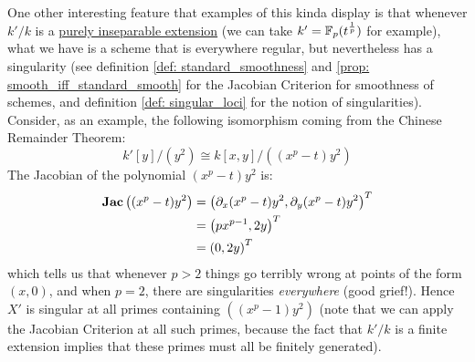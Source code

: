 \begin{example}
\begin{enumerate}
                        One other interesting feature that examples of this kinda display is that whenever $k'/k$ is a \href{https://stacks.math.columbia.edu/tag/09HD}{\underline{purely inseparable extension}} (we can take $k' = \mathbb{F}_p(t^{\frac1p})$ for example), what we have is a scheme that is everywhere regular, but nevertheless has a singularity (see definition \ref{def: standard_smoothness} and \ref{prop: smooth_iff_standard_smooth} for the Jacobian Criterion for smoothness of schemes, and definition \ref{def: singular_loci} for the notion of singularities). Consider, as an example, the following isomorphism coming from the Chinese Remainder Theorem:
                            $$k'[y]/(y^2) \cong k[x, y]/\left( (x^p - t) y^2 \right)$$
                        The Jacobian of the polynomial $(x^p - t)y^2$ is:
                            $$
                                \begin{aligned}
                                    \mathbf{Jac}\left((x^p - t)y^2\right) & = \left( \partial_x (x^p - t)y^2, \partial_y (x^p - t)y^2\right)^T
                                    \\
                                    & = \left( px^{p-1}, 2y \right)^T
                                    \\
                                    & = \left( 0, 2y\right)^T
                                \end{aligned}
                            $$
                        which tells us that whenever $p > 2$ things go terribly wrong at points of the form $(x, 0)$, and when $p = 2$, there are singularities \textit{everywhere} (good grief!). Hence $X'$ is singular at all primes containing $((x^p - 1)y^2)$ (note that we can apply the Jacobian Criterion at all such primes, because the fact that $k'/k$ is a finite extension implies that these primes must all be finitely generated). 
                    \end{enumerate}
                \end{example}
                
